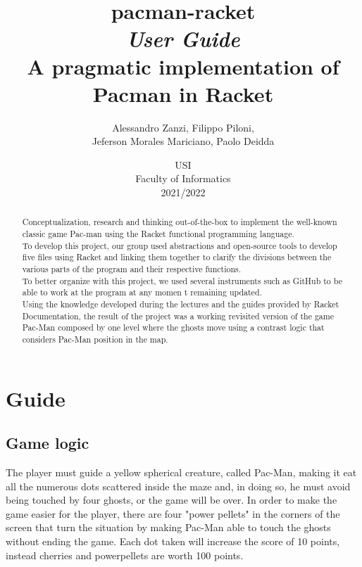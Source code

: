 \documentclass{article}
\title{
\textbf{pacman-racket} \\
\textit{User Guide}\\
A pragmatic implementation of Pacman in Racket\\

}
\author{
    Alessandro Zanzi,
    Filippo Piloni,\\
    Jeferson Morales Mariciano,
    Paolo Deidda
}
\date{
USI \\
Faculty of Informatics \\
[\baselineskip]  2021/2022
}
\begin{document}
\begin{titlepage}
\maketitle  

\end{titlepage}
  \begin{abstract}
Conceptualization, research and thinking out-of-the-box
to implement the well-known classic game Pac-man
using the Racket functional programming language.\\
To develop this project, our group used abstractions and open-source tools to develop five files using Racket and linking them together to clarify the divisions between the various parts of the program and their respective functions.\\
To better organize with this project, we used several instruments such as GitHub to be able to work at the program at any momen t remaining updated.\\
Using the knowledge developed during the lectures and the guides provided by Racket Documentation, the result of the project was a working revisited version of the game Pac-Man composed by one level where the ghosts move using a contrast logic that considers Pac-Man position in the map.

 \end{abstract}
 \clearpage
  \tableofcontents
 \clearpage

\section{Guide}

\subsection{Game logic}
 The player must guide a yellow spherical creature, called Pac-Man, making it eat all the numerous dots scattered inside the maze and, in doing so, he must avoid being touched by four ghosts, or the game will be over. In order to make the game easier for the player, there are four "power pellets" in the corners of the screen that turn the situation by making Pac-Man able to touch the ghosts without ending the game. Each dot taken will increase the score of 10 points, instead cherries and powerpellets are worth 100 points.
\end{document}
